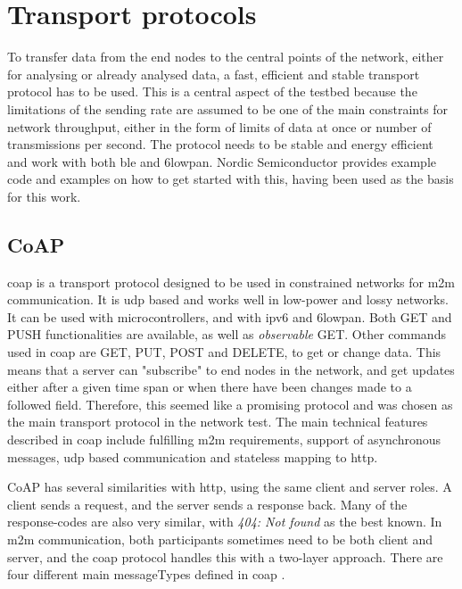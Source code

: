 

\section{Transport protocols}

\noindent To transfer data from the end nodes to the central points of the network, either for analysing or already analysed data, a fast, efficient and stable transport protocol has to be used. This is a central aspect of the testbed because the limitations of the sending rate are assumed to be one of the main constraints for network throughput, either in the form of limits of data at once or number of transmissions per second. The protocol needs to be stable and energy efficient and work with both \gls{ble} and \gls{6lowpan}. Nordic Semiconductor provides example code and examples on how to get started with this, having been used as the basis for this work.

\subsection{CoAP}

 
\noindent \gls{coap} is a transport protocol designed to be used in constrained networks for \gls{m2m} communication. It is \gls{udp} based and works well in low-power and lossy networks. It can be used with \glspl{microcontroller}, and with \gls{ipv6} and \gls{6lowpan}. Both GET and PUSH functionalities are available, as well as \textit{observable} GET. Other commands used in \gls{coap} are GET, PUT, POST and DELETE, to get or change data. This means that a server can "subscribe" to end nodes in the network, and get updates either after a given time span or when there have been changes made to a followed field. Therefore, this seemed like a promising protocol and was chosen as the main transport protocol in the network test\cite{shelby2014constrained}. The main technical features described in \gls{coap} include fulfilling \gls{m2m} requirements, support of asynchronous messages, \gls{udp} based communication and stateless mapping to \gls{http}. 

\noindent CoAP has several similarities with \gls{http}, using the same client and server roles. A client sends a request, and the server sends a response back. Many of the response-codes are also very similar, with \textit{404: Not found} as the best known. In \gls{m2m} communication, both participants sometimes need to be both client and server, and the \gls {coap} protocol handles this with a two-layer approach. There are four different main \glspl{messageType} defined in \gls{coap} \cite{shelby2014constrained}. 


